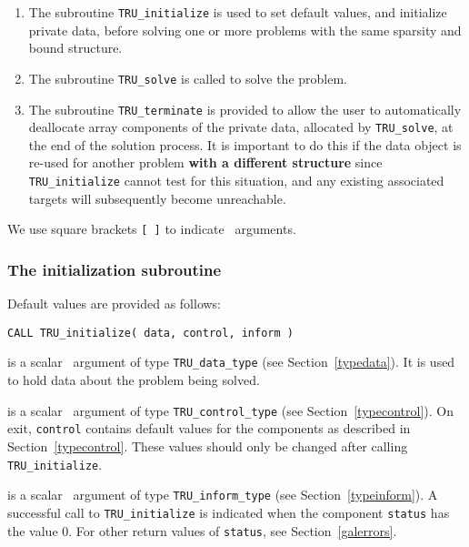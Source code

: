 \documentclass{galahad}
\newcommand{\packagename}{TRU}
\begin{document}
\begin{enumerate}
\item The subroutine
      {\tt \packagename\_initialize}
      is used to set default values, and initialize private data,
      before solving one or more problems with the
      same sparsity and bound structure.
\item The subroutine
      {\tt \packagename\_solve}
      is called to solve the problem.
\item The subroutine
      {\tt \packagename\_terminate}
      is provided to allow the user to automatically deallocate array
       components of the private data, allocated by
       {\tt \packagename\_solve},
       at the end of the solution process.
       It is important to do this if the data object is re-used for another
       problem {\bf with a different structure}
       since {\tt \packagename\_initialize} cannot test for this situation,
       and any existing associated targets will subsequently become unreachable.
\end{enumerate}
We use square brackets {\tt [ ]} to indicate \optional\ arguments.


\subsubsection{The initialization subroutine}\label{subinit}
 Default values are provided as follows:
\vspace*{1mm}

\hspace{8mm}
{\tt CALL \packagename\_initialize( data, control, inform )}

\vspace*{-3mm}
\begin{description}

 is a scalar \intentinout\ argument of type
{\tt \packagename\_data\_type}
(see Section~\ref{typedata}). It is used to hold data about the problem being
solved.

 is a scalar \intentout\ argument of type
{\tt \packagename\_control\_type}
(see Section~\ref{typecontrol}).
On exit, {\tt control} contains default values for the components as
described in Section~\ref{typecontrol}.
These values should only be changed after calling
{\tt \packagename\_initialize}.

 is a scalar \intentout\ argument of type
{\tt \packagename\_inform\_type}
(see Section~\ref{typeinform}). A successful call to
{\tt \packagename\_initialize}
is indicated when the  component {\tt status} has the value 0.
For other return values of {\tt status}, see Section~\ref{galerrors}.

\end{description}
\end{document}
